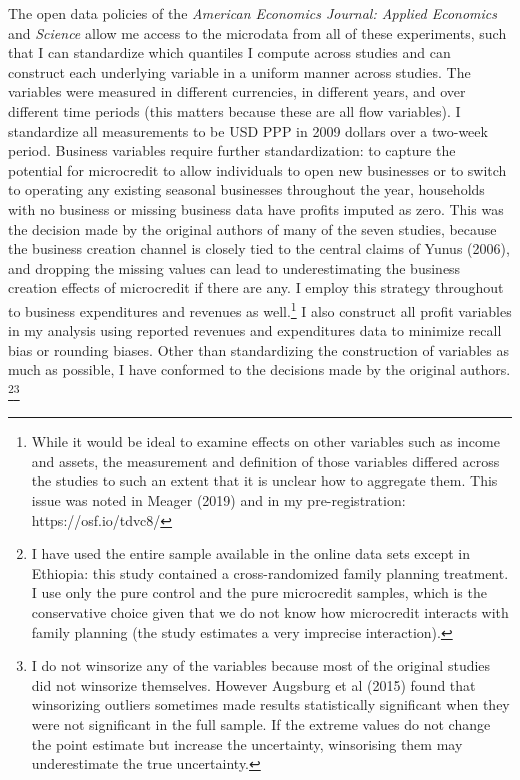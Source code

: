 \documentclass[AER]{AEA}
\begin{document}

The open data policies of the \emph{American Economics Journal: Applied Economics} and \emph{Science} allow me access to the microdata from all of these experiments, such that I can standardize which quantiles I compute across studies and can construct each underlying variable in a uniform manner across studies. The variables were measured in different currencies, in different years, and over different time periods (this matters because these are all flow variables). I standardize all measurements to be USD PPP in 2009 dollars over a two-week period. Business variables require further standardization: to capture the potential for microcredit to allow individuals to open new businesses or to switch to operating any existing seasonal businesses throughout the year, households with no business or missing business data have profits imputed as zero. This was the decision made by the original authors of many of the seven studies, because the business creation channel is closely tied to the central claims of Yunus (2006), and dropping the missing values can lead to underestimating the business creation effects of microcredit if there are any. I employ this strategy throughout to business expenditures and revenues as well.\footnote{While it would be ideal to examine effects on other variables such as income and assets, the measurement and definition of those variables differed across the studies to such an extent that it is unclear how to aggregate them. This issue was noted in Meager (2019) and in my pre-registration: https://osf.io/tdvc8/} I also construct all profit variables in my analysis using reported revenues and expenditures data to minimize recall bias or rounding biases. Other than standardizing the construction of variables as much as possible, I have conformed to the decisions made by the original authors. \footnote{I have used the entire sample available in the online data sets except in Ethiopia: this study contained a cross-randomized family planning treatment. I use only the pure control and the pure microcredit samples, which is the conservative choice given that we do not know how microcredit interacts with family planning (the study estimates a very imprecise interaction).}\footnote{I do not winsorize any of the variables because most of the original studies did not winsorize themselves. However Augsburg et al (2015) found that winsorizing outliers sometimes made results statistically significant when they were not significant in the full sample. If the extreme values do not change the point estimate but increase the uncertainty, winsorising them may underestimate the true uncertainty.}
\end{document}
